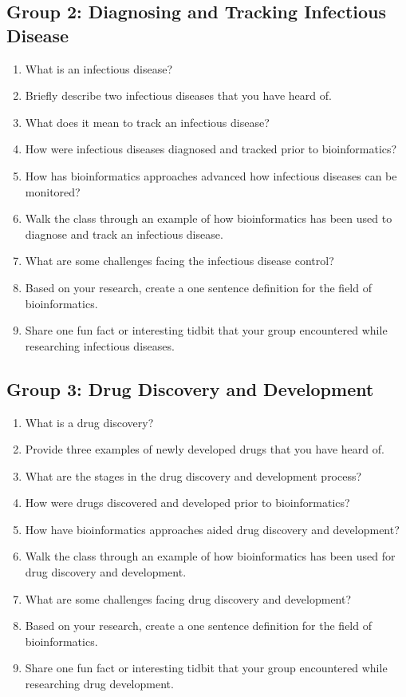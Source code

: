 \subsection*{Group 2: Diagnosing and Tracking Infectious Disease }
\begin{enumerate}
	\item What is an infectious disease?
	\item Briefly describe two infectious diseases that you have heard of.
	\item What does it mean to track an infectious disease?
	\item How were infectious diseases diagnosed and tracked prior to bioinformatics?
	\item How has bioinformatics approaches advanced how infectious diseases can be monitored?
	\item Walk the class through an example of how bioinformatics has been used to diagnose and track an infectious disease.
	\item What are some challenges facing the infectious disease control?
	\item Based on your research, create a one sentence definition for the field of bioinformatics.
	\item Share one fun fact or interesting tidbit that your group encountered while researching infectious diseases.
\end{enumerate}

\subsection*{Group 3: Drug Discovery and Development }
\begin{enumerate}
	\item What is a drug discovery?
	\item Provide three examples of newly developed drugs that you have heard of.
	\item What are the stages in the drug discovery and development process?
	\item How were drugs discovered and developed prior to bioinformatics?
	\item How have bioinformatics approaches aided drug discovery and development?
	\item Walk the class through an example of how bioinformatics 	has been used for drug discovery and development.
	\item What are some challenges facing drug discovery and development?
	\item Based on your research, create a one sentence definition for the field of bioinformatics.
	\item Share one fun fact or interesting tidbit that your group encountered while researching drug development.
\end{enumerate}


